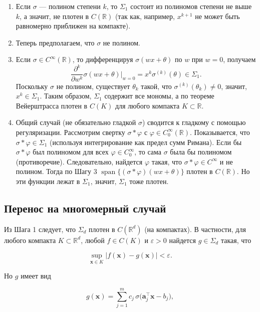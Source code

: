 \documentclass[12pt]{article}
\DeclareMathOperator{\SpanOp}{span}
\begin{document}
	\begin{enumerate}
		\item Если $\sigma$ --- полином степени $k$, то $\Sigma_1$ состоит из полиномов степени не выше $k$, а значит, не плотен в $C(\mathbb{R})$ (так как, например, $x^{k+1}$ не может быть равномерно приближен на компакте).
		
		\item Теперь предполагаем, что $\sigma$ не полином.
		
		\item Если $\sigma \in C^{\infty}(\mathbb{R})$, то дифференцируя $\sigma(w x + \theta)$ по $w$ при $w = 0$, получаем
		\[
		\frac{\partial^k}{\partial w^k} \sigma(w x + \theta) \Big|_{w=0} = x^k \sigma^{(k)}(\theta) \in \Sigma_1.
		\]
		Поскольку $\sigma$ не полином, существует $\theta_k$ такой, что $\sigma^{(k)}(\theta_k) \neq 0$, значит, $x^k \in \Sigma_1$.
		Таким образом, $\Sigma_1$ содержит все мономы, а по теореме Вейерштрасса плотен в $C(K)$ для любого компакта $K \subset \mathbb{R}$.
		
		\item Общий случай (не обязательно гладкой $\sigma$) сводится к гладкому с помощью регуляризации.
		Рассмотрим свертку $\sigma * \varphi$ с $\varphi \in C_0^{\infty}(\mathbb{R})$. Показывается, что $\sigma * \varphi \in \Sigma_1$ (используя интегрирование как предел сумм Римана).
		Если бы $\sigma * \varphi$ был полиномом для всех $\varphi \in C_0^{\infty}$, то сама $\sigma$ была бы полиномом (противоречие).
		Следовательно, найдется $\varphi$ такая, что $\sigma * \varphi \in C^{\infty}$ и не полином. Тогда по Шагу 3 $\SpanOp\{ (\sigma * \varphi)(w x + \theta) \}$ плотен в $C(\mathbb{R})$. Но эти функции лежат в $\Sigma_1$, значит, $\Sigma_1$ тоже плотен.
	\end{enumerate}
	
	\subsection{Перенос на многомерный случай}
	
	Из Шага 1 следует, что $\Sigma_d$ плотен в $C(\mathbb{R}^d)$ (на компактах).
	В частности, для любого компакта $K \subset \mathbb{R}^d$, любой $f \in C(K)$ и $\varepsilon > 0$ найдется $g \in \Sigma_d$ такая, что
	
	\[
	\sup_{\mathbf{x} \in K} |f(\mathbf{x}) - g(\mathbf{x})| < \varepsilon.
	\]
	
	Но $g$ имеет вид
	
	\[
	g(\mathbf{x}) = \sum_{j=1}^{m} c_j \, \sigma\bigl( \mathbf{a}_j^{\!\top} \mathbf{x} - b_j \bigr),
	\]
	
\end{document}

